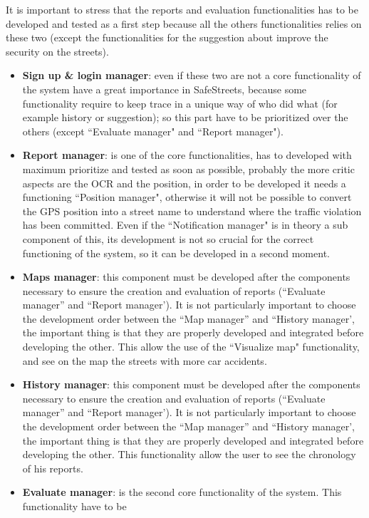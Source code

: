 \documentclass[12pt,a4paper]{report}
\begin{document}
			\newpage
			It is important to stress that the reports and evaluation functionalities has to be developed and tested
			as a first step because all the others functionalities relies on these two (except the functionalities for the suggestion
			about improve the security on the streets).
			\begin{itemize}
				\item \textbf{Sign up \& login manager}: even if these two are not a core functionality of the system have a
					great importance in SafeStreets, because some functionality require to keep trace in a unique way of
					who did what (for example history or suggestion); so this part have to be prioritized over the others
					(except ``Evaluate manager" and ``Report manager"). 
				\item \textbf{Report manager}: is one of the core functionalities, has to developed with maximum prioritize
					and tested as soon as possible, probably the more critic aspects are the OCR and the position, in order
					to be developed it needs a functioning ``Position manager", otherwise it will not be possible to convert
					the GPS position into a street name to understand where the traffic violation has been committed.
					Even if the ``Notification manager"  is in theory a sub component of this, its development is not so
					crucial for the correct functioning of the system, so it can be developed in a second moment.  
				\item \textbf{Maps manager}:  this component must be developed after the components necessary to
					ensure the creation and evaluation of reports (``Evaluate manager'' and ``Report manager'). It is not
					particularly important to choose the development order between the ``Map manager'' and ``History
					manager', the important thing is that they are properly developed and integrated before developing
					the other. This allow the use of the ``Visualize map" functionality, and see on the map the streets with
					more car accidents.
				\item \textbf{History manager}:  this component must be developed after the components necessary to
					ensure the creation and evaluation of reports (``Evaluate manager'' and ``Report manager'). It is not
					particularly important to choose the development order between the ``Map manager'' and ``History
					manager', the important thing is that they are properly developed and integrated before developing
					the other. This functionality allow the user to see the chronology of his reports.
				\item \textbf{Evaluate manager}: is the second core functionality of the system. This functionality have to be

\end{itemize}
\end{document}

